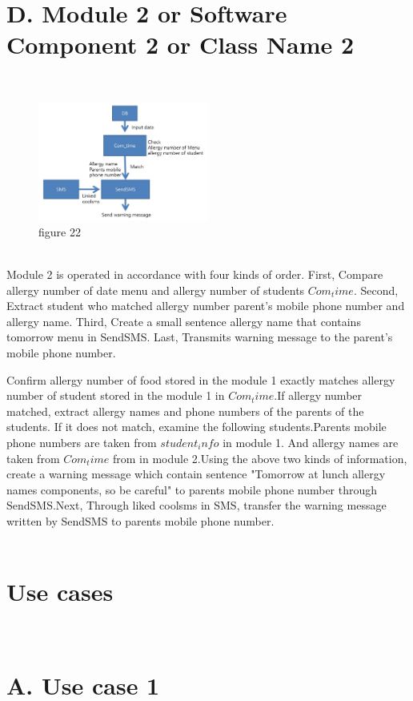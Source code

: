 \documentclass[a4paper,11pt]{IEEEtran}
\begin{document}
{{{\section*{D. Module 2 or Software Component 2 or Class Name 2}
~\\
\begin{figure}[!h]
        \centering
        \includegraphics[width=0.5\textwidth, height=0.5\textheight]{m2.jpg}
        \caption{figure 22}
        \label{fig1}
\end{figure}
~\\
Module 2 is operated in accordance with four kinds of order.
First, Compare allergy number of date menu and allergy number of students $Com_time$.
Second, Extract student who matched allergy number parent's mobile phone number and allergy name.
Third, Create a small sentence allergy name that contains tomorrow menu  in SendSMS.
Last, Transmits warning message to the parent's mobile phone number.

Confirm allergy number of food stored in the module 1 exactly matches allergy number of student stored in the module 1 in $Com_time$.If allergy number matched, extract allergy names and phone numbers of the parents of the students. If it does not match, examine the following students.Parents mobile phone numbers are taken from $student_info$ in module 1. And allergy names are taken from $Com_time$ from in module 2.Using the above two kinds of information, create a warning message which contain sentence "Tomorrow at lunch allergy names components, so be careful" to parents mobile phone number through SendSMS.Next, Through liked coolsms in SMS, transfer the warning message written by SendSMS to parents mobile phone number.
~\\
~\\
}
{\large
\section{Use cases}
~\\
\section*{A. Use case 1}
~\\

}}}
\end{document}
